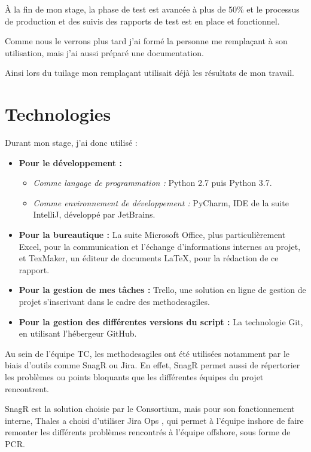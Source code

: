À la fin de mon stage, la phase de test est avancée à plus de 50\% et le processus de production et des suivis des rapports de test est en place et fonctionnel.

Comme nous le verrons plus tard j'ai formé la personne me remplaçant à son utilisation, mais j'ai aussi préparé une documentation.

Ainsi lors du tuilage mon remplaçant utilisait déjà les résultats de mon travail.

\section{Technologies}
Durant mon stage, j'ai donc utilisé :
\begin{itemize}
\item \textbf{Pour le développement :}
\begin{itemize}
\item \textit{Comme langage de programmation :} Python 2.7 puis Python 3.7.
\item \textit{Comme environnement de développement :} PyCharm, \gls{IDE} de la suite IntelliJ, développé par JetBrains.
\end{itemize}
\item \textbf{Pour la bureautique :} La suite Microsoft Office, plus particulièrement Excel, pour la communication et l'échange d'informations internes au projet, et TexMaker, un éditeur de documents \gls{LaTeX}, pour la rédaction de ce rapport.
\item \textbf{Pour la gestion de mes tâches :} Trello, une solution en ligne de gestion de projet s'inscrivant dans le cadre des \gls{methodesagiles}.
\item \textbf{Pour la gestion des différentes versions du script :} La technologie \gls{Git}, en utilisant l'hébergeur GitHub.
\end{itemize}

Au sein de l'équipe \gls{TC}, les \gls{methodesagiles} ont été utilisées notamment par le biais d'outils comme \gls{SnagR} ou Jira. En effet, \gls{SnagR} permet aussi de répertorier les problèmes ou points bloquants que les différentes équipes du projet rencontrent.

\gls{SnagR} est la solution choisie par le Consortium, mais pour son fonctionnement interne, Thales a choisi d'utiliser Jira Ops , qui permet à l'équipe inshore de faire remonter les différents problèmes rencontrés à l'équipe offshore, sous forme de \gls{PCR}.

